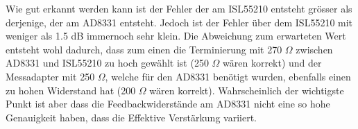 Wie gut erkannt werden kann ist der Fehler der am ISL55210 entsteht grösser als derjenige, der am AD8331 entsteht. Jedoch ist der Fehler über dem ISL55210 mit weniger als 1.5 dB immernoch sehr klein. Die Abweichung zum erwarteten Wert entsteht wohl dadurch, dass zum einen die Terminierung mit 270 $\Omega$ zwischen AD8331 und ISL55210 zu hoch gewählt ist (250 $\Omega$ wären korrekt) und der Messadapter mit 250 $\Omega$, welche für den AD8331 benötigt wurden, ebenfalls einen zu hohen Widerstand hat (200 $\Omega$ wären korrekt). Wahrscheinlich der wichtigste Punkt ist aber dass die Feedbackwiderstände am AD8331 nicht eine so hohe Genauigkeit haben, dass die Effektive Verstärkung variiert.